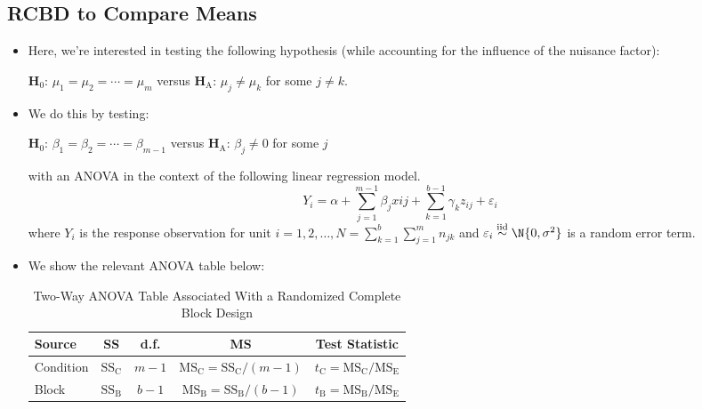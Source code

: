 \subsection{RCBD to Compare Means}
\begin{itemize}
      \item Here, we're interested in testing the following hypothesis (while accounting for the influence of the
            nuisance factor):
            \begin{tightcenter}
                  $ \mathbf{H}_0 $: $ \mu_1=\mu_2=\cdots=\mu_m $ versus $ \mathbf{H}_\text{A} $: $ \mu_j\ne \mu_k $ for some $ j\ne k $.
            \end{tightcenter}
      \item We do this by testing:
            \begin{tightcenter}
                  $ \mathbf{H}_0 $: $ \beta_1=\beta_2=\cdots=\beta_{m-1} $ versus $ \mathbf{H}_\text{A} $: $ \beta_j\ne 0 $ for some $ j $
            \end{tightcenter}
            with an ANOVA in the context of the following linear regression model.
            \[ Y_i=\alpha+\sum_{j=1}^{m-1} \beta_j x{ij}+\sum_{k=1}^{b-1} \gamma_k z_{ij}+\varepsilon_i \]
            where $ Y_i $ is the response observation for unit $ i=1,2,\ldots,N=\sum_{k=1}^{b} \sum_{j=1}^{m} n_{jk} $
            and $ \varepsilon_i \stackrel{\text{iid}}{\sim}\N{0,\sigma^2} $ is a random error term.
      \item We show the relevant ANOVA table below:
            \begin{table}[!htbp]
                  \centering
                  \caption{Two-Way ANOVA Table Associated With a Randomized Complete Block Design}
                  \begin{NiceTabular}{|l|c|c|c|c|}
                        \toprule
                        Source    & SS                     & d.f.        & MS                                                                   & Test Statistic                                           \\
                        \midrule
                        Condition & $ \text{SS}_\text{C} $ & $ m-1 $     & $ \text{MS}_\text{C}=\text{SS}_\text{C}/(m-1) $     & $ t_\text{C}=\text{MS}_\text{C}/\text{MS}_\text{E} $ \\
                        Block     & $ \text{SS}_\text{B} $ & $ b-1 $     & $ \text{MS}_\text{B}=\text{SS}_\text{B}/(b-1) $     & $ t_\text{B}=\text{MS}_\text{B}/\text{MS}_\text{E} $ \\

\end{NiceTabular}
\end{table}
\end{itemize}
